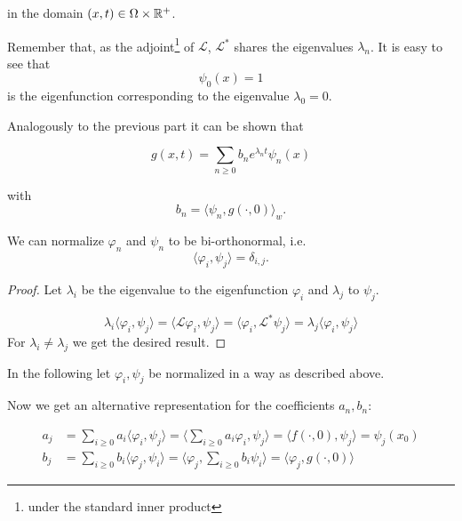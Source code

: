 in the domain $(x,t)\in \Omega\times\mathbb{R}^+$.

Remember that, as the adjoint\footnote{under the standard inner product} of $\mathcal{L}$, $\mathcal{L}^*$ shares the eigenvalues $\lambda_n$. It is easy to see that
\begin{equation}\label{eq:firstEigenfunctionConstant}
\psi_0(x)=1
\end{equation}
is the eigenfunction corresponding to the eigenvalue $\lambda_0 = 0$.

Analogously to the previous part it can be shown that

\begin{equation*}
g(x,t) = \sum_{n\geq 0} b_n e^{\lambda_n t}\psi_n(x)
\end{equation*}

with 
\begin{equation*}
b_n = \langle \psi_n, g(\cdot, 0) \rangle_w.
\end{equation*}

\begin{lemma}
We can normalize $\varphi_n$ and $\psi_n$ to be bi-orthonormal, i.e.
\begin{equation}\label{eq:biorthonormality}
\langle \varphi_i, \psi_j \rangle = \delta_{i,j}.
\end{equation}
\end{lemma}

\begin{proof}
Let $\lambda_i$ be the eigenvalue to the eigenfunction $\varphi_i$ and $\lambda_j$ to $\psi_j$.

\begin{equation*}
\lambda_i \langle \varphi_i, \psi_j \rangle =
\langle \mathcal{L}\varphi_i, \psi_j \rangle =
\langle \varphi_i, \mathcal{L}^*\psi_j \rangle =
\lambda_j \langle \varphi_i, \psi_j \rangle
\end{equation*}
For $\lambda_i \neq \lambda_j$ we get the desired result.
\end{proof}

In the following let $\varphi_i, \psi_j$ be normalized in a way as described above.

Now we get an alternative representation for the coefficients $a_n, b_n$:

\begin{equation}\label{eq:alternativeReprForCoefficients}\begin{aligned}
a_j&= \sum_{i\geq 0} a_i \langle \varphi_i, \psi_j \rangle
    = \langle \sum_{i\geq 0} a_i \varphi_i, \psi_j \rangle
    = \langle f(\cdot, 0), \psi_j \rangle = \psi_j(x_0)\\
b_j&= \sum_{i\geq 0} b_i \langle \varphi_j, \psi_i \rangle
    = \langle \varphi_j, \sum_{i\geq 0} b_i \psi_i \rangle
    = \langle \varphi_j, g(\cdot, 0) \rangle
\end{aligned}\end{equation}

